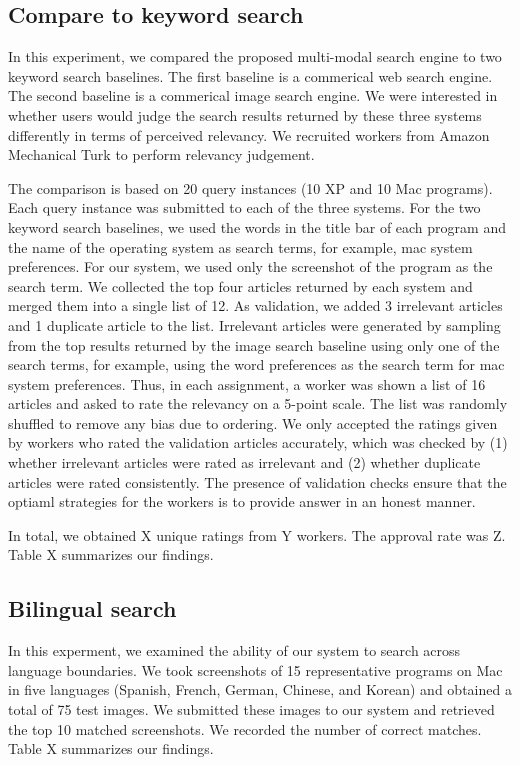 \documentclass{www2010-submission}
\begin{document}
\subsection{Compare to keyword search}

In this experiment, we compared the proposed multi-modal search engine
to two keyword search baselines. The first baseline is a commerical
web search engine.  The second baseline is a commerical image search
engine. We were interested in whether users would judge the search
results returned by these three systems differently in terms of
perceived relevancy. We recruited workers from Amazon Mechanical Turk
to perform relevancy judgement.

The comparison is based on 20 query instances (10 XP and 10 Mac
programs). Each query instance was submitted to each of the three
systems. For the two keyword search baselines, we used the words in
the title bar of each program and the name of the operating system as
search terms, for example, mac system preferences. For our system, we
used only the screenshot of the program as the search term. We
collected the top four articles returned by each system and merged
them into a single list of 12. As validation, we added 3 irrelevant
articles and 1 duplicate article to the list. Irrelevant articles were
generated by sampling from the top results returned by the image
search baseline using only one of the search terms, for example, using
the word preferences as the search term for mac system
preferences. Thus, in each assignment, a worker was shown a list of 16
articles and asked to rate the relevancy on a 5-point scale. The list
was randomly shuffled to remove any bias due to ordering.  We only
accepted the ratings given by workers who rated the validation
articles accurately, which was checked by (1) whether irrelevant
articles were rated as irrelevant and (2) whether duplicate articles
were rated consistently. The presence of validation checks
ensure that the optiaml strategies for the workers is to
provide answer in an honest manner.

In total, we obtained X unique ratings from Y workers. The 
approval rate was Z. Table X summarizes our findings. 

\subsection{Bilingual search}

In this experment, we examined the ability of our system to search
across language boundaries. We took screenshots of 15 representative
programs on Mac in five languages (Spanish, French, German,
Chinese, and Korean) and obtained a total of 75 test
images.  We submitted these images to our 
system and retrieved the top 10 matched screenshots. We recorded
the number of correct matches. Table X summarizes
our findings.
\end{document}
